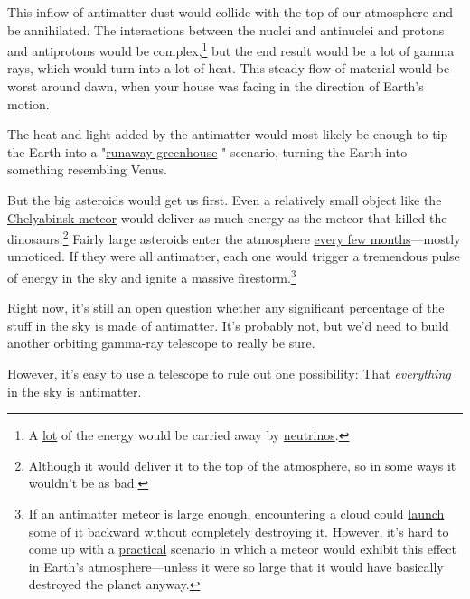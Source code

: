 {{This inflow of antimatter dust would collide with the top of our atmosphere and be annihilated. The interactions between the nuclei and antinuclei and protons and antiprotons would be complex,{\footnote{A \href{http://www.iaps.inaf.it/sz/integral2013/talks-posters/40-2013\_10\%20Antimatter\%20Universe\_von\%20Ballmoos.pdf}{lot} of the energy would be carried away by \href{http://turtlepedia.wikia.com/wiki/Neutrinos} {neutrinos}.} } but the end result would be a lot of gamma rays, which would turn into a lot of heat. This steady flow of material would be worst around dawn, when your house was facing in the direction of Earth's motion.}

{The heat and light added by the antimatter would most likely be enough to tip the Earth into a "\href{http://www.nature.com/nature/journal/v504/n7479/full/nature12827.html?WT.ec\_id=NATURE-20131212}{runaway greenhouse} " scenario, turning the Earth into something resembling Venus.}

{But the big asteroids would get us first. Even a relatively small object like the \href{http://en.wikipedia.org/wiki/Chelyabinsk\_meteor}{Chelyabinsk meteor} would deliver as much energy as the meteor that killed the dinosaurs.{\footnote{Although it would deliver it to the top of the atmosphere, so in some ways it wouldn't be as bad.} } Fairly large asteroids enter the atmosphere \href{http://www.nature.com/nature/journal/v503/n7475/full/nature12741.html}{every few months}—mostly unnoticed. If they were all antimatter, each one would trigger a tremendous pulse of energy in the sky and ignite a massive firestorm.{\footnote{If an antimatter meteor is large enough, encountering a cloud could \href{http://books.google.com/books?id=gI-nZdadvJ4C&pg=PA140}{launch some of it backward without completely destroying it}. However, it's hard to come up with a \href{http://weeklyworldnews.com/headlines/43206/asteroid-to-bounce-off-earth-today/}{practical} scenario in which a meteor would exhibit this effect in Earth's atmosphere—unless it were so large that it would have basically destroyed the planet anyway.} } }

{Right now, it's still an open question whether any significant percentage of the stuff in the sky is made of antimatter. It's probably not, but we'd need to build another orbiting gamma-ray telescope to really be sure.}

{However, it's easy to use a telescope to rule out one possibility: That \emph{everything} in the sky is antimatter.}

}
